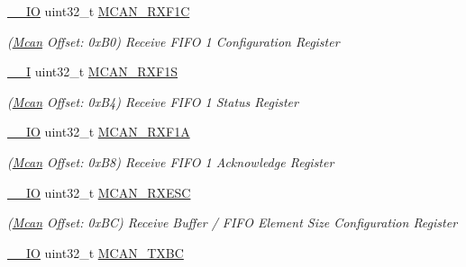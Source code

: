 \begin{DoxyCompactItemize}
\mbox{\hyperlink{core__cm7_8h_aec43007d9998a0a0e01faede4133d6be}{\+\_\+\+\_\+\+IO}} uint32\+\_\+t \mbox{\hyperlink{structMcan_ac435d27ad1032489e93e49cdc657b832}{M\+C\+A\+N\+\_\+\+R\+X\+F1C}}
\begin{DoxyCompactList}\small\item\em (\mbox{\hyperlink{structMcan}{Mcan}} Offset\+: 0x\+B0) Receive F\+I\+FO 1 Configuration Register \end{DoxyCompactList}\item 
\mbox{\label{structMcan_a4f22585b2b0425e7d6fafccd3748ef48}} 
\mbox{\hyperlink{core__cm7_8h_af63697ed9952cc71e1225efe205f6cd3}{\+\_\+\+\_\+I}} uint32\+\_\+t \mbox{\hyperlink{structMcan_a4f22585b2b0425e7d6fafccd3748ef48}{M\+C\+A\+N\+\_\+\+R\+X\+F1S}}
\begin{DoxyCompactList}\small\item\em (\mbox{\hyperlink{structMcan}{Mcan}} Offset\+: 0x\+B4) Receive F\+I\+FO 1 Status Register \end{DoxyCompactList}\item 
\mbox{\label{structMcan_a26a2dc733921b22e7c1b81ce157c5311}} 
\mbox{\hyperlink{core__cm7_8h_aec43007d9998a0a0e01faede4133d6be}{\+\_\+\+\_\+\+IO}} uint32\+\_\+t \mbox{\hyperlink{structMcan_a26a2dc733921b22e7c1b81ce157c5311}{M\+C\+A\+N\+\_\+\+R\+X\+F1A}}
\begin{DoxyCompactList}\small\item\em (\mbox{\hyperlink{structMcan}{Mcan}} Offset\+: 0x\+B8) Receive F\+I\+FO 1 Acknowledge Register \end{DoxyCompactList}\item 
\mbox{\label{structMcan_a856fa1b75b4fb5464a30195921f790e7}} 
\mbox{\hyperlink{core__cm7_8h_aec43007d9998a0a0e01faede4133d6be}{\+\_\+\+\_\+\+IO}} uint32\+\_\+t \mbox{\hyperlink{structMcan_a856fa1b75b4fb5464a30195921f790e7}{M\+C\+A\+N\+\_\+\+R\+X\+E\+SC}}
\begin{DoxyCompactList}\small\item\em (\mbox{\hyperlink{structMcan}{Mcan}} Offset\+: 0x\+BC) Receive Buffer / F\+I\+FO Element Size Configuration Register \end{DoxyCompactList}\item 
\mbox{\label{structMcan_a8de3ad1b62b3c8d56d85d4cce2eb666e}} 
\mbox{\hyperlink{core__cm7_8h_aec43007d9998a0a0e01faede4133d6be}{\+\_\+\+\_\+\+IO}} uint32\+\_\+t \mbox{\hyperlink{structMcan_a8de3ad1b62b3c8d56d85d4cce2eb666e}{M\+C\+A\+N\+\_\+\+T\+X\+BC}}

\end{DoxyCompactItemize}
